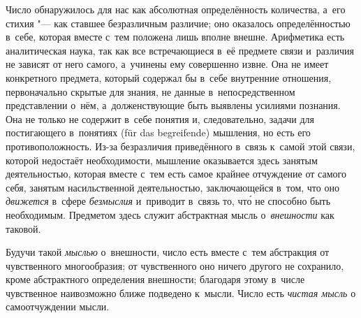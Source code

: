 Число обнаружилось для нас как абсолютная определённость количества, а~его
стихия "--- как ставшее безразличным различие; оно оказалось определённостью
в~себе, которая вместе с~тем положена лишь вполне внешне. Арифметика есть
аналитическая наука, так как все встречающиеся в~её предмете связи и~различия
не зависят от него самого, а~учинены ему совершенно извне. Она не имеет
конкретного предмета, который содержал бы в~себе внутренние отношения,
первоначально скрытые для знания, не данные в~непосредственном представлении
о~нём, а~долженствующие быть выявлены усилиями познания. Она не только не
содержит в~себе понятия и, следовательно, задачи для постигающего в~понятиях
(für das begrei\-fende) мышления, но есть его противоположность. Из-за
безразличия приведённого в~связь к~самой этой связи, которой недостаёт необходимости,
мышление оказывается здесь занятым деятельностью, которая вместе с~тем есть
самое крайнее отчуждение от самого себя, занятым насильственной деятельностью,
заключающейся в~том, что оно {\em движется} в~сфере {\em безмыслия} и~приводит
в~связь то, чт\'{о} не способно быть необходимым. Предметом здесь
служит абстрактная мысль о~{\em внешности} как таковой.

Будучи такой {\em мыслью} о~внешности, число есть вместе с~тем абстракция от
чувственного многообразия; от чувственного оно ничего другого не сохранило,
кроме абстрактного определения внешности; благодаря этому в~числе чувственное
наивозможно ближе подведено к~мысли. Число есть {\em чистая мысль} о
самоотчуждении мысли.

